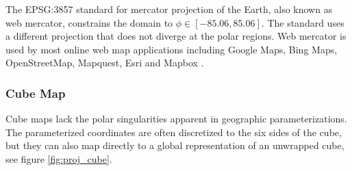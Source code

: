 The EPSG:3857 standard for mercator projection of the Earth, also known as web mercator, constrains the domain to $\phi \in [-85.06, 85.06]$. The standard uses a different projection that does not diverge at the polar regions. Web mercator is used by most online web map applications including Google Maps, Bing Maps, OpenStreetMap, Mapquest, Esri and Mapbox \cite{battersby14}.

\subsubsection{Cube Map}

Cube maps lack the polar singularities apparent in geographic parameterizations. The parameterized coordinates are often discretized to the six sides of the cube, but they can also map directly to a global representation of an unwrapped cube, see figure \ref{fig:proj_cube}.

